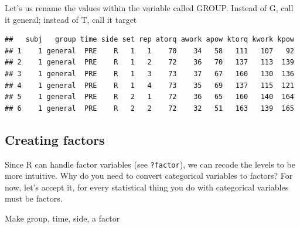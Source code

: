 \documentclass[
]{book}
\newenvironment{Shaded}{\begin{snugshade}}{\end{snugshade}}
\newcommand{\CommentTok}[1]{\textcolor[rgb]{0.56,0.35,0.01}{\textit{#1}}}
\newcommand{\DataTypeTok}[1]{\textcolor[rgb]{0.13,0.29,0.53}{#1}}
\newcommand{\KeywordTok}[1]{\textcolor[rgb]{0.13,0.29,0.53}{\textbf{#1}}}
\newcommand{\NormalTok}[1]{#1}
\newcommand{\OperatorTok}[1]{\textcolor[rgb]{0.81,0.36,0.00}{\textbf{#1}}}
\newcommand{\StringTok}[1]{\textcolor[rgb]{0.31,0.60,0.02}{#1}}
\begin{document}
Let's us rename the values within the variable called GROUP. Instead of G, call it general; instead of T, call it target

\begin{Shaded}
\end{Shaded}

\begin{verbatim}
##   subj   group time side set rep atorq awork apow ktorq kwork kpow
## 1    1 general  PRE    R   1   1    70    34   58   111   107   92
## 2    1 general  PRE    R   1   2    72    36   70   137   113  139
## 3    1 general  PRE    R   1   3    73    37   67   160   130  136
## 4    1 general  PRE    R   1   4    73    35   69   137   115  121
## 5    1 general  PRE    R   2   1    72    36   65   160   140  164
## 6    1 general  PRE    R   2   2    72    32   51   163   139  165
\end{verbatim}

\hypertarget{creating-factors}{%
\subsection*{Creating factors}\label{creating-factors}}

Since R can handle factor variables (see \texttt{?factor}), we can recode the levels to be more intuitive. Why do you need to convert categorical variables to factors? For now, let's accept it, for every statistical thing you do with categorical variables must be factors.

Make group, time, side, a factor
\end{document}
